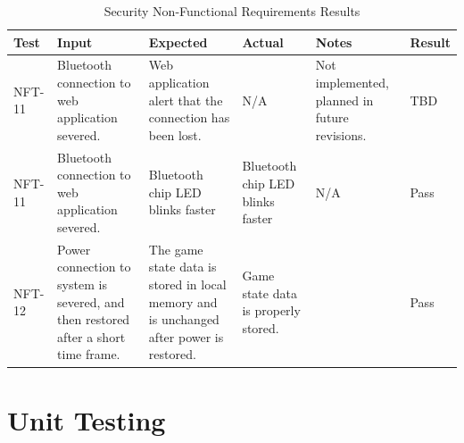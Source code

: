 \documentclass[12pt, titlepage]{article}
\begin{document}
\begin{table}[H]
\centering
    \setlength{\leftmargini}{0cm}
    \begin{tabular}{| >{\centering\arraybackslash}m{1cm} | 
        >{\centering\arraybackslash}m{2.5cm} | 
        >{\centering\arraybackslash}m{4cm} | 
        >{\centering\arraybackslash}m{3cm} |
        >{\centering\arraybackslash}m{3cm} |
        >{\centering\arraybackslash}m{1.5cm} |}
    \hline
    \rowcolor[gray]{0.9}
    Test & Input & Expected & Actual & Notes & Result\\
    \hline
    NFT-11 & Bluetooth connection to web application severed. & Web application alert that the connection has been lost. & N/A & Not implemented, planned in future revisions. & TBD \\
    NFT-11 & Bluetooth connection to web application severed. & Bluetooth chip LED blinks faster & Bluetooth chip LED blinks faster & N/A & Pass \\
    \hline
    NFT-12 & Power connection to system is severed, and then restored after a short time frame. & The game state data is stored in local memory and is unchanged after power is restored. & Game state data is properly stored. &  & Pass \\
    \hline
    \end{tabular}
\caption{Security Non-Functional Requirements Results}
\end{table}

\section{Unit Testing} \label{UnitTest}
\end{document}
